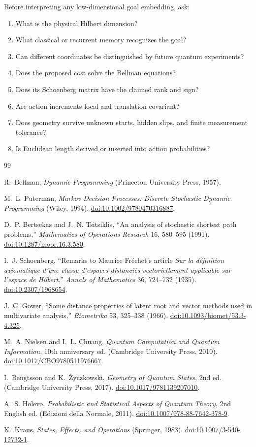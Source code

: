\documentclass[11pt]{article}
\theoremstyle{definition}
\theoremstyle{remark}
\newcommand{\doi}[1]{\href{https://doi.org/#1}{doi:#1}}
\begin{document}
\medskip
Before interpreting any low-dimensional goal embedding, ask:
\begin{enumerate}
 \item What is the physical Hilbert dimension?
 \item What classical or recurrent memory recognizes the goal?
 \item Can different coordinates be distinguished by future quantum
 experiments?
 \item Does the proposed cost solve the Bellman equations?
 \item Does its Schoenberg matrix have the claimed rank and sign?
 \item Are action increments local and translation covariant?
 \item Does geometry survive unknown starts, hidden slips, and finite
 measurement tolerance?
 \item Is Euclidean length derived or inserted into action probabilities?
\end{enumerate}
\begin{thebibliography}{99}

R.~Bellman, \emph{Dynamic Programming}
(Princeton University Press, 1957).

M.~L. Puterman, \emph{Markov Decision Processes:
Discrete Stochastic Dynamic Programming}
(Wiley, 1994). \doi{10.1002/9780470316887}.

D.~P. Bertsekas and J.~N. Tsitsiklis,
“An analysis of stochastic shortest path problems,”
\emph{Mathematics of Operations Research} 16, 580--595 (1991).
\doi{10.1287/moor.16.3.580}.

I.~J. Schoenberg,
“Remarks to Maurice Fr\'echet's article
\emph{Sur la d\'efinition axiomatique d'une classe d'espaces distanci\'es
vectoriellement applicable sur l'espace de Hilbert},”
\emph{Annals of Mathematics} 36, 724--732 (1935).
\doi{10.2307/1968654}.

J.~C. Gower,
“Some distance properties of latent root and vector methods used in
multivariate analysis,”
\emph{Biometrika} 53, 325--338 (1966).
\doi{10.1093/biomet/53.3-4.325}.

M.~A. Nielsen and I.~L. Chuang,
\emph{Quantum Computation and Quantum Information},
10th anniversary ed. (Cambridge University Press, 2010).
\doi{10.1017/CBO9780511976667}.

I.~Bengtsson and K.~\.{Z}yczkowski,
\emph{Geometry of Quantum States}, 2nd ed.
(Cambridge University Press, 2017).
\doi{10.1017/9781139207010}.

A.~S. Holevo,
\emph{Probabilistic and Statistical Aspects of Quantum Theory},
2nd English ed. (Edizioni della Normale, 2011).
\doi{10.1007/978-88-7642-378-9}.

K.~Kraus, \emph{States, Effects, and Operations}
(Springer, 1983). \doi{10.1007/3-540-12732-1}.

\end{thebibliography}
\end{document}
